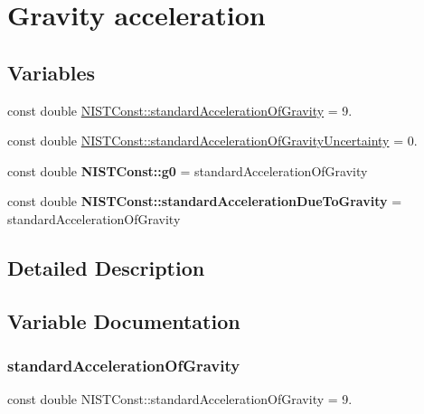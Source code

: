 \hypertarget{group___gravity_acceleration}{}\section{Gravity acceleration}
\label{group___gravity_acceleration}
\subsection*{Variables}
\begin{DoxyCompactItemize}
\item 
const double \hyperlink{group___gravity_acceleration_gad5bc5f7f030bc2c467a8430e00b42f5e}{N\+I\+S\+T\+Const\+::standard\+Acceleration\+Of\+Gravity} = 9.
\item 
const double \hyperlink{group___gravity_acceleration_gaabc6df92c25677a5b767445f101d4f57}{N\+I\+S\+T\+Const\+::standard\+Acceleration\+Of\+Gravity\+Uncertainty} = 0.
\item 
\mbox{\label{group___gravity_acceleration_ga1fd0cec0a449e40eb603ac6292027924}} 
const double {\bfseries N\+I\+S\+T\+Const\+::g0} = standard\+Acceleration\+Of\+Gravity
\item 
\mbox{\label{group___gravity_acceleration_ga7d417cb0027680e48ff481ab68a0864e}} 
const double {\bfseries N\+I\+S\+T\+Const\+::standard\+Acceleration\+Due\+To\+Gravity} = standard\+Acceleration\+Of\+Gravity
\end{DoxyCompactItemize}


\subsection{Detailed Description}


\subsection{Variable Documentation}
\mbox{\label{group___gravity_acceleration_gad5bc5f7f030bc2c467a8430e00b42f5e}} 
\subsubsection{\texorpdfstring{standard\+Acceleration\+Of\+Gravity}{standardAccelerationOfGravity}}
{\footnotesize\ttfamily const double N\+I\+S\+T\+Const\+::standard\+Acceleration\+Of\+Gravity = 9.}

